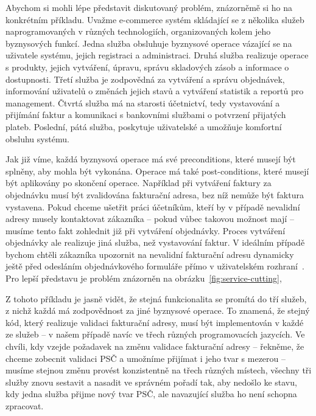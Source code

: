 Abychom si mohli lépe představit diskutovaný problém, znázorněmě
si ho na konkrétním příkladu. Uvažme e-commerce systém
skládající se z několika služeb naprogramovaných v různých technologiích,
organizovaných kolem jeho byznysových funkcí.
Jedna služba obsluhuje byznysové operace vázající
se na uživatele systému, jejich registraci a administraci. Druhá
služba realizuje operace s produkty, jejich vytváření, úpravu,
správu skladových zásob a informace o dostupnosti. Třetí služba je
zodpovědná za vytváření a správu objednávek, informování uživatelů
o změnách jejich stavů a vytváření statistik a reportů pro management.
Čtvrtá služba má na starosti účetnictví, tedy vystavování a přijímání
faktur a komunikaci s bankovními službami o potvrzení přijatých plateb.
Poslední, pátá služba, poskytuje uživatelské a umožňuje komfortní obsluhu systému.

Jak již víme, každá byznysová operace má své preconditions, které musejí být splněny,
aby mohla být vykonána. Operace má také post-conditions, které musejí být
aplikovány po skončení operace. Například při vytváření faktury za
objednávku musí být zvalidována fakturační adresa, bez níž nemůže
být faktura vystavena. Pokud chceme ušetřit práci účetníkům, kteří by
v případě nevalidní adresy musely kontaktovat zákazníka – pokud vůbec
takovou možnost mají – musíme tento fakt zohlednit již při vytváření objednávky.
Proces vytváření objednávky ale realizuje jiná služba, než vystavování faktur.
V ideálním případě bychom chtěli zákazníka upozornit na nevalidní fakturační
adresu dynamicky ještě před odesláním objednávkového formuláře přímo v uživatelském
rozhraní~\cite{cemus2017separation}. Pro lepší představu je problém znázorněn na
obrázku~\ref{fig:service-cutting},

Z tohoto příkladu je jasně vidět, že stejná funkcionalita se promítá
do tří služeb, z nichž každá má zodpovědnost za jiné byznysové operace.
To znamená, že stejný kód, který realizuje validaci fakturační adresy,
musí být implementován v každé ze služeb – v našem případě navíc ve třech
různých programovacích jazycích. Ve chvíli, kdy vzejde požadavek na změnu
validace fakturační adresy – řekněme, že chceme zobecnit
validaci PSČ a umožníme přijímat i jeho tvar s mezerou – musíme stejnou změnu
provést konzistentně na třech různých místech, všechny tři služby znovu
sestavit a nasadit ve správném pořadí tak, aby nedošlo ke stavu,
kdy jedna služba přijme nový tvar PSČ, ale navazující služba ho není
schopna zpracovat.


